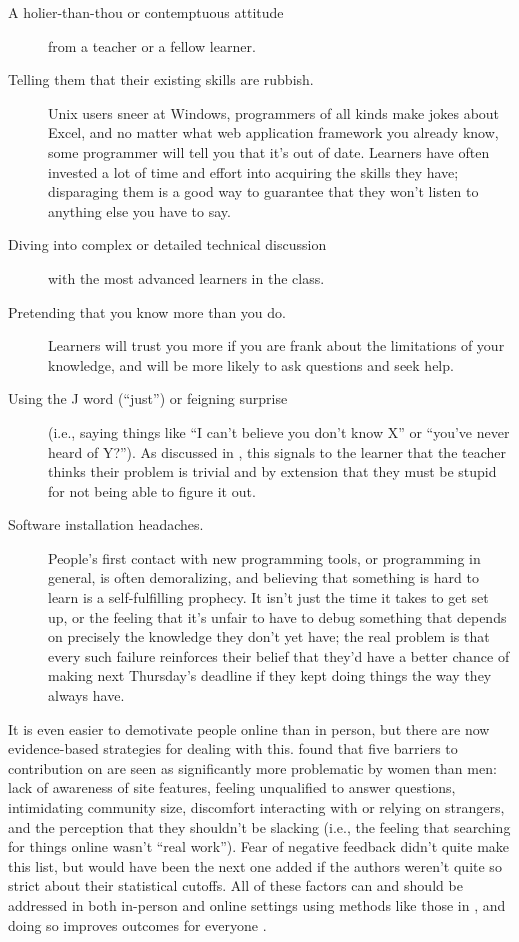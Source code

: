 \begin{description}
\item[A holier-than-thou or contemptuous attitude]
from a teacher or a fellow learner.
\item[Telling them that their existing skills are rubbish.]
Unix users sneer at Windows, programmers of all kinds make jokes
about Excel, and no matter what web application framework you
already know, some programmer will tell you that it's out of date.
Learners have often invested a lot of time and effort into acquiring
the skills they have; disparaging them is a good way to guarantee
that they won't listen to anything else you have to say.
\item[Diving into complex or detailed technical discussion]
with the most advanced learners in the class.
\item[Pretending that you know more than you do.]
Learners will trust you more if you are frank about the limitations
of your knowledge, and will be more likely to ask questions and seek
help.
\item[Using the J word (``just'') or feigning surprise]
(i.e., saying things like ``I can't believe you don't know X'' or
``you've never heard of Y?''). As discussed in
, this signals to the learner that the teacher
thinks their problem is trivial and by extension that they must be
stupid for not being able to figure it out.
\item[Software installation headaches.]
People's first contact with new programming tools, or programming in
general, is often demoralizing, and believing that something is hard
to learn is a self-fulfilling prophecy. It isn't just the time it
takes to get set up, or the feeling that it's unfair to have to
debug something that depends on precisely the knowledge they don't
yet have; the real problem is that every such failure reinforces
their belief that they'd have a better chance of making next
Thursday's deadline if they kept doing things the way they always
have.
\end{description}

It is even easier to demotivate people online than in person, but
there are now evidence-based strategies for dealing with this.
\cite{Ford2016} found that five barriers to contribution on  are seen as significantly more problematic
by women than men: lack of awareness of site features, feeling
unqualified to answer questions, intimidating community size,
discomfort interacting with or relying on strangers, and the
perception that they shouldn't be slacking (i.e., the feeling that
searching for things online wasn't ``real work''). Fear of negative
feedback didn't quite make this list, but would have been the next one
added if the authors weren't quite so strict about their statistical
cutoffs. All of these factors can and should be addressed in both
in-person and online settings using methods like those in
, and doing so improves outcomes
for everyone \cite{Sved2016}.

